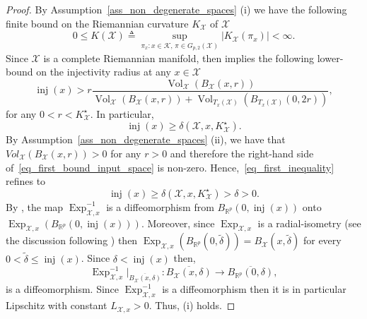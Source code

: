 \documentclass[anon,12pt]{colt2021} %
\newcommand{\rr}{{\mathbb{R}}}
\newcommand{\rrflex}[1]{{\ensuremath{\rr^{#1}
}}}
\newcommand{\rrp}{{\rrflex{p}}}
\newcommand{\xxx}{\mathcal{X}}
\newcommand{\kkk}{{\mathscr{K}}}
\begin{document}
\begin{proof}
By Assumption~\ref{ass_non_degenerate_spaces} (i) we have the following finite bound on the Riemannian curvature $K_{\xxx}$ of $\xxx$
$$
0\leq K(\xxx)\triangleq \sup_{\pi_x:x\in \kkk, \,\pi \in G_{p,2}(\xxx)} 
\left|
K_{\xxx}(\pi_x)
\right|
< \infty
.
$$
Since $\xxx$ is a complete Riemannian manifold, then \citep[Theorem 4.7]{CheegerGromovTaylorTheorem1982} implies the following lower-bound on the injectivity radius at any $x \in \xxx$ 
\begin{equation}
    \operatorname{inj}(x) > 
    r \frac{
\operatorname{Vol}_{\xxx}\left(
B_{\xxx}(x,r)
\right)
}{
\operatorname{Vol}_{\xxx}\left(
B_{\xxx}(x,r)
\right)
+
\operatorname{Vol}_{T_x(\xxx)}\left(
B_{T_x(\xxx)}(0,2r)
\right)
}
,
    \label{eq_first_bound_input_space}
\end{equation}
for any $0<r<K_{\xxx}^{\star}$.  In particular, 
\begin{equation}
    \operatorname{inj}(x)\geq 
    \delta\left(
    \xxx,x,
    K_{\xxx}^{\star}
    \right).
    \label{eq_first_inequality}
\end{equation}
By Assumption~\ref{ass_non_degenerate_spaces} (ii), we have that $Vol_{\xxx}(B_{\xxx}(x,r))>0$ for any $r>0$ and therefore the right-hand side of~\eqref{eq_first_bound_input_space} is non-zero. Hence,~\eqref{eq_first_inequality} refines to
\begin{equation}
    \operatorname{inj}(x)\geq 
    \delta\left(
    \xxx,x,
    K_{\xxx}^{\star}
    \right)>\delta >0
    .
    \label{eq_first_inequality_useable}
\end{equation}
By \citep[Corollary 1.7.1]{jost2008riemannian}, the map $\operatorname{Exp}_{\xxx,x}^{-1}$ is a diffeomorphism from $B_{\rrp}(0,\operatorname{inj}(x))$ onto $\operatorname{Exp}_{\xxx,x}\left(
B_{\rrp}(0,\operatorname{inj}(x))
\right)$.  Moreover, since $\operatorname{Exp}_{\xxx,x}$ is a radial-isometry (see the discussion following \citep[Corollary 1.4.2]{jost2008riemannian}) then
$
\operatorname{Exp}_{\xxx,x}\left(
B_{\rrp}(0,\tilde{\delta})
\right) =
B_{\xxx}(x,\tilde{\delta})
$ for every $0<\tilde{\delta}\leq \operatorname{inj}(x)$. Since $\delta<\operatorname{inj}(x)$ then,
\begin{equation}
    \operatorname{Exp}_{\xxx,x}^{-1}|_{\overline{B_{\xxx}(x,\delta)}}:\overline{B_{\xxx}(x,\delta)} \rightarrow \overline{B_{\rrp}(0,\delta)}
    ,
    \label{eq_diffeo}
\end{equation}
is a diffeomorphism.  Since $\operatorname{Exp}_{\xxx,x}^{-1}$ is a diffeomorphism then it is in particular Lipschitz with constant $L_{\xxx,x}>0$.  Thus, (i) holds.  


\end{proof}
\end{document}
